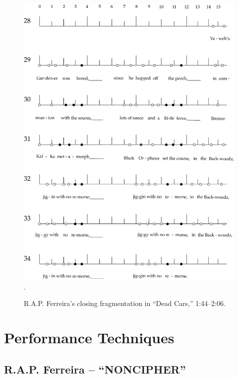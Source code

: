     \begin{figure}[!htp]
        \centering
        \includegraphics{images/figures/chp 03/144206deadcarsendfrag.pdf}
        .\caption{R.A.P. Ferreira's closing fragmentation in ``Dead Cars,'' 1:44--2:06.}
        \label{fig:roryclosingfrag}
    \end{figure}


\newpage
\section{Performance Techniques}
\subsection*{\centering R.A.P. Ferreira -- ``NONCIPHER''}
    
